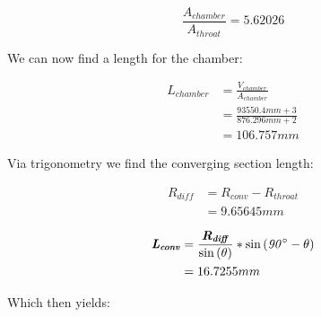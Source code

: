 \documentclass[12pt]{report}
\begin{document}
\vspace{6 mm}

\begin{equation}
\frac{\boldsymbol{\mathit{A_{chamber}}}}{\boldsymbol{\mathit{A_{throat}}}} = 5.62026
\end{equation}


\vspace{10 mm}

We can now find a length for the chamber:



\vspace{6 mm}

\begin{equation}
\begin{split}
\boldsymbol{\mathit{L_{chamber}}} & = \frac{\boldsymbol{\mathit{V_{chamber}}}}{\boldsymbol{\mathit{A_{chamber}}}}\\
 & = \frac{93550.4 mm+3 }{876.296 mm+2 }\\
 & = 106.757 mm 
\end{split}
\end{equation}


\vspace{10 mm}

Via trigonometry we find the converging section length:



\vspace{6 mm}

\begin{equation}
\begin{split}
\boldsymbol{\mathit{R_{diff}}} & = \boldsymbol{\mathit{R_{conv}}} - \boldsymbol{\mathit{R_{throat}}}\\
 & = 9.65645 mm 
\end{split}
\end{equation}


\vspace{10 mm}

\begin{equation}
\begin{split}
\boldsymbol{\mathit{L_{conv}}} & = \frac{\boldsymbol{\mathit{R_{diff}}}}{\sin{\left(\mathit{\theta}\right)}} * \sin{\left(\mathit{90\degree} - \mathit{\theta}\right)}\\
 & = 16.7255 mm 
\end{split}
\end{equation}


\vspace{6 mm}

Which then yields:
\end{document}
